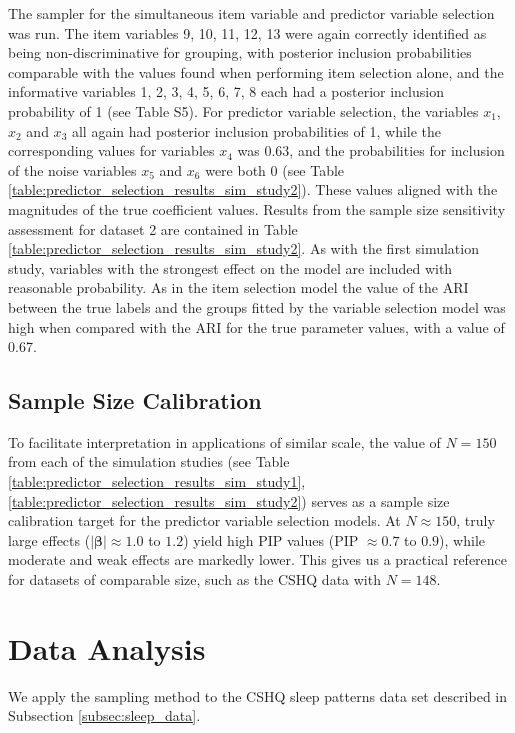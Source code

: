 \documentclass[11pt]{article}
\def\bsbet{\boldsymbol{\beta}}
\theoremstyle{plain}
\theoremstyle{definition}
\begin{document}
The sampler for the simultaneous item variable and predictor variable selection was run. The item variables 9, 10, 11, 12, 13 were again correctly identified as being non-discriminative for grouping, with posterior inclusion probabilities comparable with the values found when performing item selection alone, and the informative variables 1, 2, 3, 4, 5, 6, 7, 8 each had a posterior inclusion probability of 1 (see Table S5). For predictor variable selection, the variables $x_1$, $x_2$ and $x_3$ all again had posterior inclusion probabilities of 1, while the corresponding values for variables $x_4$ was 0.63, and the probabilities for inclusion of the noise variables $x_5$ and $x_6$ were both 0 (see Table \ref{table:predictor_selection_results_sim_study2}). These values aligned with the magnitudes of the true coefficient values. Results from the sample size sensitivity assessment for dataset 2 are contained in Table \ref{table:predictor_selection_results_sim_study2}. As with the first simulation study, variables with the strongest effect on the model are included with reasonable probability. 
As in the item selection model the value of the ARI between the true labels and the groups fitted by the variable selection model was high when compared with the ARI for the true parameter values, with a value of 0.67.
\subsection{Sample Size Calibration}\label{subsec:samplesize_calibration}
To facilitate interpretation in applications of similar scale, the value of $N = 150$ from each of the simulation studies (see Table \ref{table:predictor_selection_results_sim_study1}, \ref{table:predictor_selection_results_sim_study2}) serves as a sample size calibration target for the predictor variable selection models. At $N \approx 150$, truly large effects ($|\bsbet| \approx 1.0$ to $1.2$) yield high PIP values (PIP $\approx 0.7$ to $0.9$), while moderate and weak effects are markedly lower. This gives us a practical reference for datasets of comparable size, such as the CSHQ data with $N = 148$.
\section{Data Analysis}\label{sec:results}
We apply the sampling method to the CSHQ sleep patterns data set described in Subsection \ref{subsec:sleep_data}. 
\end{document}
